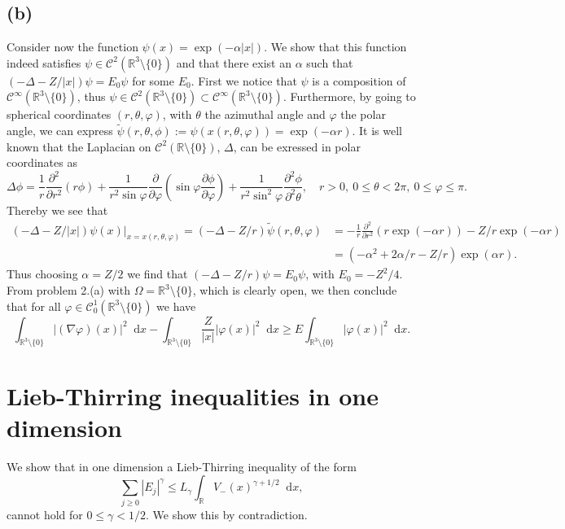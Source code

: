 \documentclass[a4paper,11pt]{article}
\newcommand{\abs}[1]{\left\lvert #1 \right\rvert}
\newcommand*\diff{\mathop{}\!\mathrm{d}}
\newcommand{\R}{\mathbb{R}}
\numberwithin{equation}{section}
\begin{document}
\subsection*{(b)} Consider now the function $ \psi(x)=\exp(-\alpha\abs{x}) $. We show that this function indeed satisfies $ \psi\in \mathcal{C}^2(\R^3\setminus\{0\}) $ and that there exist an $ \alpha $ such that $ (-\Delta-Z/\abs{x})\psi=E_0\psi $ for some $ E_0 $. First we notice that $ \psi $ is a composition of $ \mathcal{C}^\infty(\R^3\setminus\{0\}) $, thus $ \psi\in\mathcal{C}^2(\R^3\setminus\{0\})\subset\mathcal{C}^\infty(\R^3\setminus\{0\}) $. Furthermore, by going to spherical coordinates $ (r,\theta,\varphi) $, with $ \theta $ the azimuthal angle and $ \varphi $ the polar angle, we can express $ \tilde{\psi}(r,\theta,\phi):=\psi(x(r,\theta,\varphi))=\exp(-\alpha r) $. It is well known that the Laplacian on $ \mathcal{C}^2(\R\setminus\{0\}) $, $ \Delta $, can be exressed in polar coordinates as \begin{equation}
\Delta\phi=\frac{1}{r}\frac{\partial^2}{\partial r^2}(r\phi)+\frac{1}{r^2\sin\varphi}\frac{\partial}{\partial\varphi}(\sin\varphi\frac{\partial\phi}{\partial\varphi})+\frac{1}{r^2\sin^2\varphi}\frac{\partial^2\phi}{\partial^2\theta}, \quad r>0,\ 0\leq\theta<2\pi,\ 0\leq\varphi\leq\pi.
\end{equation}
Thereby we see that \begin{equation*}
\begin{aligned}
(-\Delta-Z/\abs{x})\psi(x)\rvert_{x=x(r,\theta,\varphi)}=(-\Delta-Z/r)\tilde{\psi}(r,\theta,\varphi)&=-\frac{1}{r}\frac{\partial^2}{\partial r^2}(r \exp(-\alpha r))-Z/r\exp(-\alpha r)\\
&=(-\alpha^2+2\alpha/r-Z/r)\exp(\alpha r).
\end{aligned}
\end{equation*} 
Thus choosing $ \alpha=Z/2 $ we find that $ (-\Delta-Z/r)\psi=E_0\psi $, with  $ E_0=-Z^2/4 $. From problem 2.(a) with $ \Omega=\R^3\setminus\{0\} $, which is clearly open, we then conclude that for all $ \varphi\in\mathcal{C}_0^1(\R^3\setminus\{0\}) $ we have 
\begin{equation}
\int_{\R^3\setminus\{0\}}\lvert(\nabla\varphi)(x) \rvert^2\diff x-\int_{\R^3\setminus\{0\}}\frac{Z}{\abs{x}}\lvert\varphi(x)\rvert^2 \diff x\geq E\int_{\R^3\setminus\{0\}}\lvert\varphi(x)\rvert^2 \diff x.
\end{equation}
\section{Lieb-Thirring inequalities in one dimension}
We show that in one dimension a Lieb-Thirring inequality of the form \begin{equation}
\sum_{j\geq0}\abs{E_j}^\gamma\leq L_\gamma\int_{\R}V_{-}(x)^{\gamma+1/2}\diff x,
\end{equation}
cannot hold for $ 0\leq\gamma < 1/2 $. We show this by contradiction.
\end{document}
